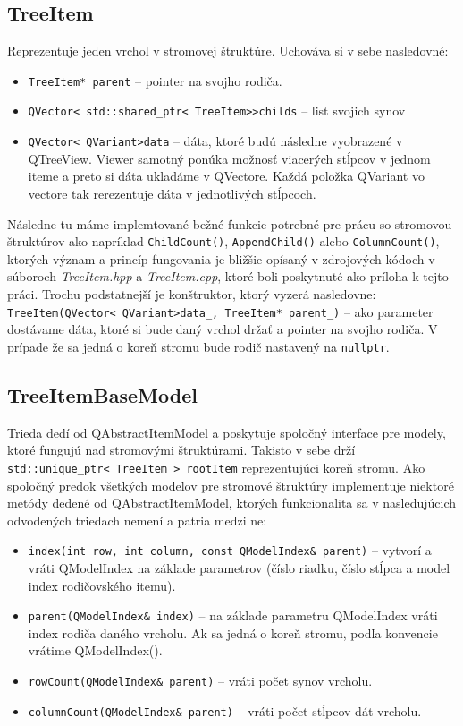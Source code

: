 \subsection{TreeItem}
\label{kap04:sec:tree_item}
Reprezentuje jeden vrchol v stromovej štruktúre. Uchováva si v sebe nasledovné:
\begin{itemize}
\item \texttt{TreeItem* parent} -- pointer na svojho rodiča.
\item \texttt{QVector\textless~std::shared\_ptr\textless~TreeItem\textgreater\textgreater childs} -- list svojich synov
\item \texttt{QVector\textless~QVariant\textgreater data} -- dáta, ktoré budú následne vyobrazené v QTreeView. Viewer samotný ponúka možnosť viacerých stĺpcov v jednom iteme a preto si dáta ukladáme v QVectore. Každá položka QVariant vo vectore tak rerezentuje dáta v jednotlivých stĺpcoch.
\end{itemize} 

Následne tu máme implemtované bežné funkcie potrebné pre prácu so stromovou štruktúrov ako napríklad \texttt{ChildCount()}, \texttt{AppendChild()} alebo \texttt{Column\-Count()}, ktorých význam a princíp fungovania je bližšie opísaný v zdrojových kódoch v súboroch \textit{TreeItem.hpp} a \textit{TreeItem.cpp}, ktoré boli poskytnuté ako príloha k tejto práci.
Trochu podstatnejší je konštruktor, ktorý vyzerá nasledovne:
\texttt{TreeItem(QVector\textless~QVariant\textgreater data\_, TreeItem* parent\_)} -- ako parameter dostávame dáta, ktoré si bude daný vrchol držať a pointer na svojho rodiča. V prípade že sa jedná o koreň stromu bude rodič nastavený na \texttt{nullptr}.



\subsection{TreeItemBaseModel}
Trieda dedí od QAbstractItemModel a poskytuje spoločný interface pre modely, ktoré fungujú nad stromovými štruktúrami. Takisto v sebe drží \texttt{std::unique\_ptr\textless~TreeItem~\textgreater~rootItem} reprezentujúci koreň stromu. Ako spoločný predok všetkých modelov pre stromové štruktúry implementuje niektoré metódy dedené od QAbstractItemModel, ktorých funkcionalita sa v nasledujúcich odvodených triedach nemení a patria medzi ne:
\begin{itemize}
\item \texttt{index(int row, int column, const QModelIndex\& parent)} -- vytvorí a vráti QModelIndex na základe parametrov (číslo riad\-ku, číslo stĺpca a model index rodičovského itemu).
\item \texttt{parent(QModelIndex\& index)} -- na základe parametru QModelIndex vráti index rodiča daného vrcholu. Ak sa jedná o koreň stromu, podľa konvencie vrátime QModelIndex().
\item \texttt{rowCount(QModelIndex\& parent)} -- vráti počet synov vrcholu.
\item \texttt{columnCount(QModelIndex\& parent)} -- vráti počet stĺpcov dát vrcholu.
\end{itemize}
 
